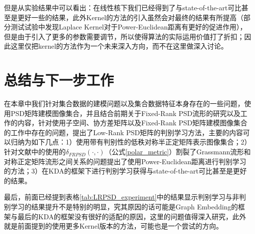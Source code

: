 但是从实验结果中可以看出：在线性核下我们已经得到了与state-of-the-art可比甚至是更好一些的结果，此外Kernel的方法的引入虽然会对最终的结果有所提高（部分测试试验中发现Laplace Kernel对于Power-Euclidean距离有更好的促进作用），但是由于引入了更多的参数需要调节，所以使得算法的实际运用价值打了折扣；因此这里仅把kernel的方法作为一个未来深入方向，而不在这里做深入讨论。
\section{总结与下一步工作}
在本章中我们针对集合数据的建模问题以及集合数据特征本身存在的一些问题，使用PSD矩阵建模图像集合，并且结合前期关于Fixed-Rank PSD流形的研究以及工作\cite{PSD_WACV}的内容，针对使用子空间、协方差矩阵以及Fixed-Rank PSD矩阵建模图像集合的工作\cite{PSD_WACV}中存在的问题，提出了Low-Rank PSD矩阵的判别学习方法，主要的内容可以归纳为如下几点：1）使用带有判别性的低秩对称半正定矩阵表示图像集合；2）针对文献\cite{PSD_WACV}中的使用的$\delta_{FRPSD}(\cdot,\cdot)$（公式\ref{polar_metric}）割裂了Grassmann流形和对称正定矩阵流形之间关系的问题提出了使用Power-Euclidean距离进行判别学习的方法；3）在KDA\cite{Kernel_KDA}的框架下进行判别学习获得与state-of-the-art可比甚至是更好的结果。

最后，前面已经提到表格\ref{tab:LRPSD_experiment}中的结果显示判别学习与非判别学习的结果提升不是特别的明显，究其原因的话可能是Graph Embedding的框架与最后的KDA的框架没有很好的适配的原因，这里的问题值得深入研究，此外就是前面提到的使用更多Kernel版本的方法，可能也是一个尝试的方向。